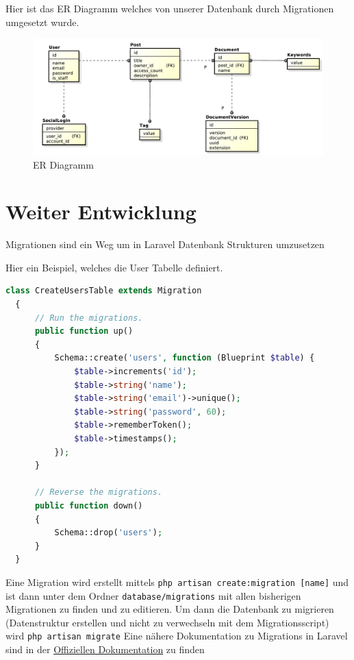 Hier ist das ER Diagramm welches von unserer Datenbank durch Migrationen umgesetzt wurde.

\begin{figure}[H]
	\begin{center}
		\includegraphics[width=\linewidth]{images/Datenstruktur.pdf}
		\caption{ER Diagramm}
	\end{center}
\end{figure}

\section{Weiter Entwicklung}

Migrationen sind ein Weg um in Laravel Datenbank Strukturen umzusetzen

Hier ein Beispiel, welches die User Tabelle definiert.

\begin{lstlisting}[language={PHP}, caption="Migrations Beispiel"]
  class CreateUsersTable extends Migration
  {
      // Run the migrations.
      public function up()
      {
          Schema::create('users', function (Blueprint $table) {
              $table->increments('id');
              $table->string('name');
              $table->string('email')->unique();
              $table->string('password', 60);
              $table->rememberToken();
              $table->timestamps();
          });
      }

      // Reverse the migrations.
      public function down()
      {
          Schema::drop('users');
      }
  }
\end{lstlisting}

Eine Migration wird erstellt mittels \texttt{php artisan create:migration [name]} und ist dann unter dem Ordner \texttt{database/migrations} mit allen bisherigen Migrationen zu finden und zu editieren.
Um dann die Datenbank zu migrieren (Datenstruktur erstellen und nicht zu verwechseln mit dem Migrationsscript) wird \texttt{php artisan migrate}
Eine n\"ahere Dokumentation zu Migrations in Laravel sind in der \href{https://laravel.com/docs/5.2/migrations}{Offiziellen Dokumentation} zu finden
